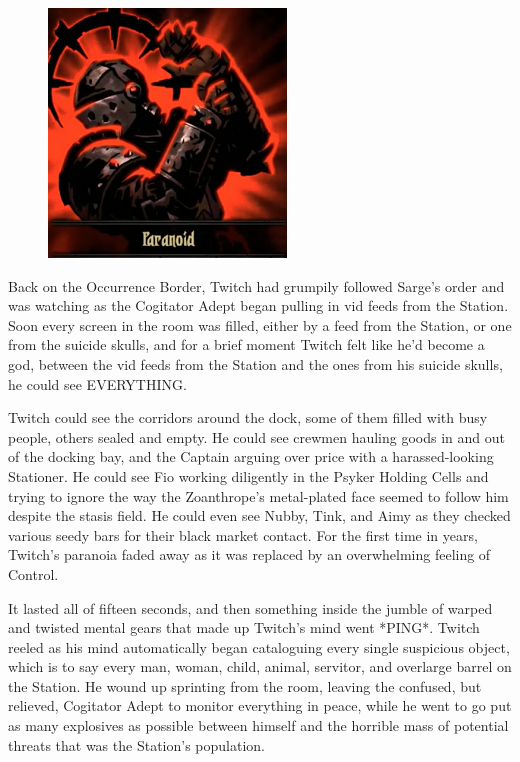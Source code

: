 \begin{figure}
	\begin{center}
		\includegraphics[width=\figwidth]{pics/14/16.png}
	\end{center}
\end{figure}
Back on the Occurrence Border, Twitch had grumpily followed Sarge's order and was watching as the Cogitator Adept began pulling in vid feeds from the Station. 
Soon every screen in the room was filled, either by a feed from the Station, or one from the suicide skulls, and for a brief moment Twitch felt like he'd become a god, between the vid feeds from the Station and the ones from his suicide skulls, he could see EVERYTHING. 


Twitch could see the corridors around the dock, some of them filled with busy people, others sealed and empty. 
He could see crewmen hauling goods in and out of the docking bay, and the Captain arguing over price with a harassed-looking Stationer. 
He could see Fio working diligently in the Psyker Holding Cells and trying to ignore the way the Zoanthrope's metal-plated face seemed to follow him despite the stasis field. 
He could even see Nubby, Tink, and Aimy as they checked various seedy bars for their black market contact. 
For the first time in years, Twitch's paranoia faded away as it was replaced by an overwhelming feeling of Control.

It lasted all of fifteen seconds, and then something inside the jumble of warped and twisted mental gears that made up Twitch's mind went *PING*. 
Twitch reeled as his mind automatically began cataloguing every single suspicious object, which is to say every man, woman, child, animal, servitor, and overlarge barrel on the Station. 
He wound up sprinting from the room, leaving the confused, but relieved, Cogitator Adept to monitor everything in peace, while he went to go put as many explosives as possible between himself and the horrible mass of potential threats that was the Station's population.

